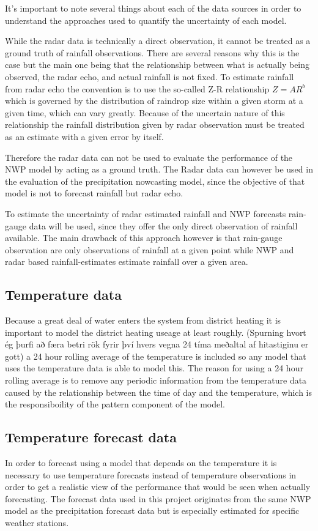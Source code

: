 It's important to note several things about each of the data sources in order to understand the approaches used to quantify the uncertainty of each model. 

While the radar data is technically a direct observation, it cannot be treated as a ground truth  of rainfall observations. There are several reasons why this is the case but the main one being that the relationship between what is actually being observed, the radar echo, and actual rainfall is not fixed. To estimate rainfall from radar echo the convention is to use the so-called Z-R relationship $Z=AR^b$ which is governed by the distribution of raindrop size within a given storm at a given time, which can vary greatly\cite{ZRrelationship}.  Because of the uncertain nature of this relationship the rainfall distribution given by radar observation must be treated as an estimate with a given error by itself.

Therefore the radar data can not be used to evaluate the performance of the NWP model by acting as a ground truth. The Radar data can however be used in the evaluation of the precipitation nowcasting model, since the objective of that model is not to forecast rainfall but radar echo. 

To estimate the uncertainty of radar estimated rainfall and NWP forecasts rain-gauge data will be used, since they offer the only direct observation of rainfall available. The main drawback of this approach however is that rain-gauge observation are only observations of rainfall at a given point while NWP and radar based rainfall-estimates estimate rainfall over a given area. 

\subsection{Temperature data}
Because a great deal of water enters the system from district heating it is important to model the district heating useage at least roughly. (Spurning hvort ég þurfi að færa betri rök fyrir því hvers vegna 24 tíma meðaltal af hitastiginu er gott) a 24 hour rolling average of the temperature is included so any model that uses the temperature data is able to model this. The reason for using a 24 hour rolling average is to remove any periodic information from the temperature data caused by the relationship between the time of day and the temperature, which is the responsiboility of the pattern component of the model.

\subsection{Temperature forecast data}
In order to forecast using a model that depends on the temperature it is necessary to use temperature forecasts instead of temperature observations in order to get a realistic view of the performance that would be seen when actually forecasting. The forecast data used in this project originates from the same NWP model as the precipitation forecast data but is especially estimated for specific weather stations. 

